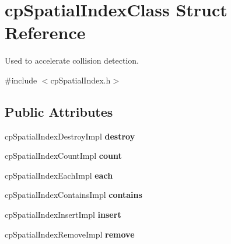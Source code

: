 \hypertarget{structcp_spatial_index_class}{}\section{cp\+Spatial\+Index\+Class Struct Reference}
\label{structcp_spatial_index_class}


Used to accelerate collision detection.  




{\ttfamily \#include $<$cp\+Spatial\+Index.\+h$>$}

\subsection*{Public Attributes}
\begin{DoxyCompactItemize}
\item 
\hypertarget{structcp_spatial_index_class_aa81432518e81917cf388f020aa0fe766}{}cp\+Spatial\+Index\+Destroy\+Impl {\bfseries destroy}\label{structcp_spatial_index_class_aa81432518e81917cf388f020aa0fe766}

\item 
\hypertarget{structcp_spatial_index_class_a611148802f63840b1c4f8a06feacd2eb}{}cp\+Spatial\+Index\+Count\+Impl {\bfseries count}\label{structcp_spatial_index_class_a611148802f63840b1c4f8a06feacd2eb}

\item 
\hypertarget{structcp_spatial_index_class_a642ebf6c60ed3edc7da5ac477c496b61}{}cp\+Spatial\+Index\+Each\+Impl {\bfseries each}\label{structcp_spatial_index_class_a642ebf6c60ed3edc7da5ac477c496b61}

\item 
\hypertarget{structcp_spatial_index_class_a08dc3736b831e921426fbb28297494e1}{}cp\+Spatial\+Index\+Contains\+Impl {\bfseries contains}\label{structcp_spatial_index_class_a08dc3736b831e921426fbb28297494e1}

\item 
\hypertarget{structcp_spatial_index_class_a5d8a8d121853ae7bcbf934e4483daa26}{}cp\+Spatial\+Index\+Insert\+Impl {\bfseries insert}\label{structcp_spatial_index_class_a5d8a8d121853ae7bcbf934e4483daa26}

\item 
\hypertarget{structcp_spatial_index_class_a420112b7d2c3d6faf07f88db697aa369}{}cp\+Spatial\+Index\+Remove\+Impl {\bfseries remove}\label{structcp_spatial_index_class_a420112b7d2c3d6faf07f88db697aa369}


\end{DoxyCompactItemize}
